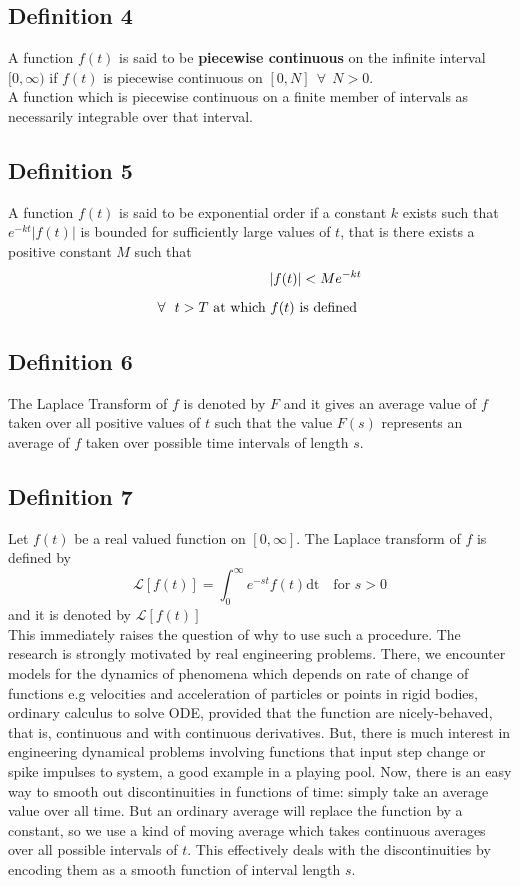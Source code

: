 \documentclass[11pt]{report}
\newcommand{\Laplace}{\mathcal{L}}
\newcommand{\ft}{f(t)}
\newcommand{\LaplaceIntegral}{\int_{0}^{\infty}e^{-st}\ft\text{dt}}
\newcommand{\sbracket}[1]{\left[#1\right]}
\newcommand{\LFt}{\Laplace \sbracket{\ft}}
\newcommand{\sps}{\\[0.2cm]}
\newcommand{\bt}[1]{\textbf{#1}}
\newcommand{\dsp}{\displaystyle}
\begin{document}
	\subsection{Definition 4}
	A function $\ft$ is said to be \bt{piecewise continuous} on the infinite interval $[0,\infty)$ if $\ft$ is piecewise continuous on $[0, N]~~\forall~~ N>0$.\sps
	A function which is piecewise continuous on a finite member of intervals as necessarily integrable over that interval.
	
	\subsection{Definition 5}
	A function $\ft$ is said to be exponential order if a constant $k$ exists such that $\dsp e^{-kt}|\ft|$ is bounded for sufficiently large values of $t$, that is there exists a positive constant $M$ such that
	\begin{eqnarray}
		|f(t)| < Me^{-kt}\sps
		\forall ~~t > T \text{ at which } \ft \text{ is defined }\notag
		\label{eq:2_1}
	\end{eqnarray}
	
	\subsection{Definition 6}
	The Laplace Transform of $f$ is denoted by $F$ and it gives an average value of $f$ taken over all positive values of $t$ such that the value $F(s)$ represents an average of $f$ taken over possible time intervals of length $s$.
	
	\subsection{Definition 7}
	Let $\ft$ be a real valued function on $[0,\infty]$. The Laplace transform of $f$ is defined by
	\begin{equation}
		\LFt = \LaplaceIntegral ~~~ \text{ for } s > 0
		\label{eq:2_2}
	\end{equation}
	and it is denoted by $\LFt$\sps
	
	This immediately raises the question of why to use such a procedure. The research is strongly motivated by real engineering problems. There, we encounter models for the dynamics of phenomena which depends on rate of change of functions e.g velocities and acceleration of particles or points in rigid bodies, ordinary calculus to solve ODE, provided that the function are nicely-behaved, that is, continuous and with continuous derivatives. But, there is much interest in engineering dynamical problems involving functions that input step change or spike impulses to system, a good example in a playing pool. Now, there is an easy way to smooth out discontinuities in functions of time: simply take an average value over all time. But an ordinary average will replace the function by a constant, so we use a kind of moving average which takes continuous averages over all possible intervals of $t$. This effectively deals with the discontinuities by encoding them as a smooth function of interval length $s$.\\
	
\end{document}
